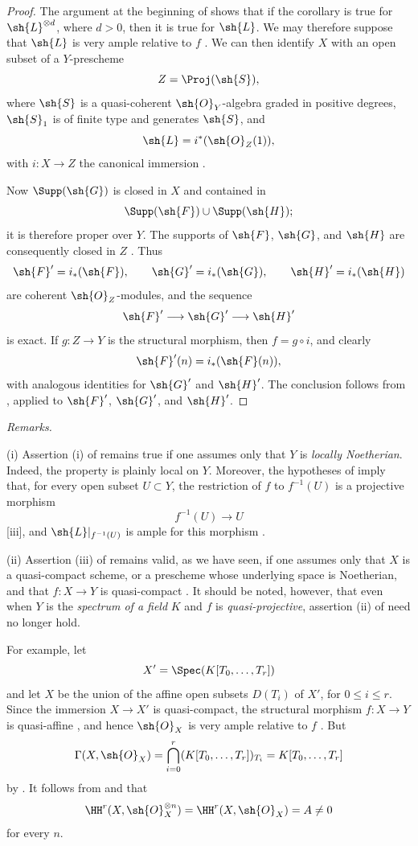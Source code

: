 \begin{proof}
The argument at the beginning of  shows that if the corollary is true for $\sh{L}^{\otimes d}$, where $d>0$, then it is true for $\sh{L}$.
We may therefore suppose that $\sh{L}$ is very ample relative to $f$ .
We can then identify $X$ with an open subset of a $Y$-prescheme
\[
  Z=\Proj(\sh{S}),
\]
where $\sh{S}$ is a quasi-coherent $\sh{O}_Y$-algebra graded in positive degrees, $\sh{S}_1$ is of finite type and generates $\sh{S}$, and
\[
  \sh{L}=i^*(\sh{O}_Z(1)),
\]
with $i:X\to Z$ the canonical immersion .

Now $\Supp(\sh{G})$ is closed in $X$ and contained in
\[
  \Supp(\sh{F})\cup\Supp(\sh{H});
\]
it is therefore proper over $Y$.
The supports of $\sh{F}$, $\sh{G}$, and $\sh{H}$ are consequently closed in $Z$ .
Thus
\[
  \sh{F}'=i_*(\sh{F}),\qquad
  \sh{G}'=i_*(\sh{G}),\qquad
  \sh{H}'=i_*(\sh{H})
\]
are coherent $\sh{O}_Z$-modules, and the sequence
\[
  \sh{F}'\longrightarrow\sh{G}'\longrightarrow\sh{H}'
\]
is exact.
If $g:Z\to Y$ is the structural morphism, then $f=g\circ i$, and clearly
\[
  \sh{F}'(n)=i_*(\sh{F}(n)),
\]
with analogous identities for $\sh{G}'$ and $\sh{H}'$.
The conclusion follows from , applied to $\sh{F}'$, $\sh{G}'$, and $\sh{H}'$.
\end{proof}

\begin{env}[2.2.5]
\label{III.2.2.5}
\emph{Remarks.}

(i) Assertion (i) of  remains true if one assumes only that $Y$ is \emph{locally Noetherian}.
Indeed, the property is plainly local on $Y$.
Moreover, the hypotheses of  imply that, for every open subset $U\subset Y$, the restriction of $f$ to $f^{-1}(U)$ is a projective morphism
\[
  f^{-1}(U)\longrightarrow U
\]
[iii], and $\sh{L}|_{f^{-1}(U)}$ is ample for this morphism .

(ii) Assertion (iii) of  remains valid, as we have seen, if one assumes only that $X$ is a quasi-compact scheme, or a prescheme whose underlying space is Noetherian, and that $f:X\to Y$ is quasi-compact .
It should be noted, however, that even when $Y$ is the \emph{spectrum of a field} $K$ and $f$ is \emph{quasi-projective}, assertion (ii) of  need no longer hold.

For example, let
\[
  X'=\Spec(K[T_0,\ldots,T_r])
\]
and let $X$ be the union of the affine open subsets $D(T_i)$ of $X'$, for $0\leq i\leq r$.
Since the immersion $X\to X'$ is quasi-compact, the structural morphism $f:X\to Y$ is quasi-affine , and hence $\sh{O}_X$ is very ample relative to $f$ .
But
\[
  \Gamma(X,\sh{O}_X)
  =\bigcap_{i=0}^r(K[T_0,\ldots,T_r])_{T_i}
  =K[T_0,\ldots,T_r]
\]
by .
It follows from  and  that
\[
  \HH^r(X,\sh{O}_X^{\otimes n})
  =\HH^r(X,\sh{O}_X)
  =A\neq0
\]
for every $n$.
\end{env}


